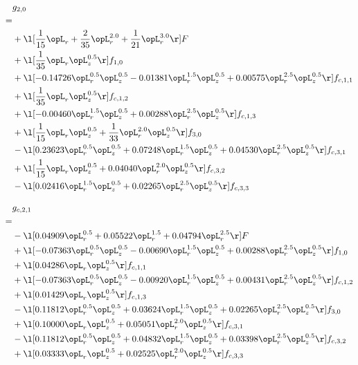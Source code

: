 \begin{alignat}{2} 
\label{eq:g_20_0} 
& g_{2,0} \nonumber \\ 
 = \\ 
& + \l[ \frac{1}{15} \opL_r + \frac{2}{35} \opL_r^{2.0} + \frac{1}{21} \opL_r^{3.0}  \r] F \nonumber \\ 
& + \l[ \frac{1}{35} \opL_r \opL_z^{0.5}  \r] f_{1,0} \nonumber \\ 
& + \l[  -0.14726 \opL_r^{0.5} \opL_z^{0.5}   -0.01381 \opL_r^{1.5} \opL_z^{0.5} +  0.00575 \opL_r^{2.5} \opL_z^{0.5}  \r] f_{c,1,1} \nonumber \\ 
& + \l[ \frac{1}{35} \opL_r \opL_z^{0.5}  \r] f_{c,1,2} \nonumber \\ 
& + \l[  -0.00460 \opL_r^{1.5} \opL_z^{0.5} +  0.00288 \opL_r^{2.5} \opL_z^{0.5}  \r] f_{c,1,3} \nonumber \\ 
& + \l[ \frac{1}{15} \opL_r \opL_z^{0.5} + \frac{1}{33} \opL_r^{2.0} \opL_z^{0.5}  \r] f_{3,0} \nonumber \\ 
& - \l[  0.23623 \opL_r^{0.5} \opL_z^{0.5} +  0.07248 \opL_r^{1.5} \opL_z^{0.5} +  0.04530 \opL_r^{2.5} \opL_z^{0.5}  \r] f_{c,3,1} \nonumber \\ 
& + \l[ \frac{1}{15} \opL_r \opL_z^{0.5} +  0.04040 \opL_r^{2.0} \opL_z^{0.5}  \r] f_{c,3,2} \nonumber \\ 
& - \l[  0.02416 \opL_r^{1.5} \opL_z^{0.5} +  0.02265 \opL_r^{2.5} \opL_z^{0.5}  \r] f_{c,3,3} \nonumber \\ 
\end{alignat} 


\begin{alignat}{2} 
\label{eq:g_21_0} 
& g_{c,2,1} \nonumber \\ 
 = \\ 
& - \l[  0.04909 \opL_r^{0.5} +  0.05522 \opL_r^{1.5} +  0.04794 \opL_r^{2.5}  \r] F \nonumber \\ 
& + \l[  -0.07363 \opL_r^{0.5} \opL_z^{0.5}   -0.00690 \opL_r^{1.5} \opL_z^{0.5} +  0.00288 \opL_r^{2.5} \opL_z^{0.5}  \r] f_{1,0} \nonumber \\ 
& + \l[  0.04286 \opL_r \opL_z^{0.5}  \r] f_{c,1,1} \nonumber \\ 
& + \l[  -0.07363 \opL_r^{0.5} \opL_z^{0.5}   -0.00920 \opL_r^{1.5} \opL_z^{0.5} +  0.00431 \opL_r^{2.5} \opL_z^{0.5}  \r] f_{c,1,2} \nonumber \\ 
& + \l[  0.01429 \opL_r \opL_z^{0.5}  \r] f_{c,1,3} \nonumber \\ 
& - \l[  0.11812 \opL_r^{0.5} \opL_z^{0.5} +  0.03624 \opL_r^{1.5} \opL_z^{0.5} +  0.02265 \opL_r^{2.5} \opL_z^{0.5}  \r] f_{3,0} \nonumber \\ 
& + \l[  0.10000 \opL_r \opL_z^{0.5} +  0.05051 \opL_r^{2.0} \opL_z^{0.5}  \r] f_{c,3,1} \nonumber \\ 
& - \l[  0.11812 \opL_r^{0.5} \opL_z^{0.5} +  0.04832 \opL_r^{1.5} \opL_z^{0.5} +  0.03398 \opL_r^{2.5} \opL_z^{0.5}  \r] f_{c,3,2} \nonumber \\ 
& + \l[  0.03333 \opL_r \opL_z^{0.5} +  0.02525 \opL_r^{2.0} \opL_z^{0.5}  \r] f_{c,3,3} \nonumber \\ 
\end{alignat} 


